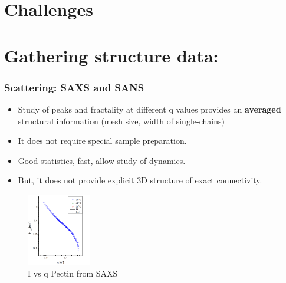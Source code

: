 \documentclass[9pt]{beamer}
\begin{document}
\section{Challenges}
\section{Gathering structure data:}

\begin{frame}
  \frametitle{Scattering: SAXS and SANS}
  \begin{itemize}
    \item Study of peaks and fractality at different q values provides an \textbf{averaged} structural information (mesh size, width of single-chains)
    \item It does not require special sample preparation.
    \item Good statistics, fast, allow study of dynamics.
    \item \alert{But}, it does not provide explicit 3D structure of exact connectivity.
  \end{itemize}
    \begin{figure}[htpb]
      \includegraphics[width=0.25\textwidth]{./Figures/saxs_pectin.png}
      \caption*{\footnotesize{I vs q Pectin from SAXS}}
    \end{figure}
\end{frame}
\end{document}

